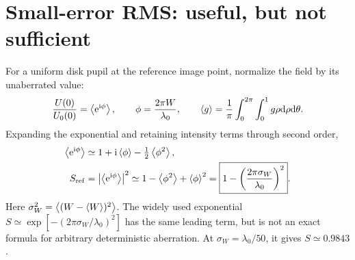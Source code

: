
\section{Small-error RMS: useful, but not sufficient}
For a uniform disk pupil at the reference image point, normalize the field by its unaberrated value:
\begin{equation}
\frac{U(0)}{U_0(0)}=\left\langle \mathrm{e}^{\mathrm{i}\phi}\right\rangle,\qquad
\phi=\frac{2\pi W}{\lambda_0},\qquad
\left\langle g\right\rangle=\frac1\pi\int_0^{2\pi}\int_0^1g\rho\mathrm{d}\rho\mathrm{d}\theta.
\end{equation}
Expanding the exponential and retaining intensity terms through second order,
\begin{align}
\left\langle \mathrm{e}^{\mathrm{i}\phi}\right\rangle&\simeq1+\mathrm{i}\left\langle \phi\right\rangle-\tfrac12\left\langle \phi^2\right\rangle,\\
S_{\rm ref}&=\left|\left\langle \mathrm{e}^{\mathrm{i}\phi}\right\rangle\right|^2
\simeq1-\left\langle \phi^2\right\rangle+\left\langle \phi\right\rangle^2
=\boxed{1-\left(\frac{2\pi\sigma_W}{\lambda_0}\right)^2}.
\end{align}
Here $\sigma_W^2=\left\langle (W-\left\langle W\right\rangle)^2\right\rangle$. The widely used exponential
$S\simeq\exp[-(2\pi\sigma_W/\lambda_0)^2]$ has the same leading term, but is not an exact formula for arbitrary deterministic aberration. At $\sigma_W=\lambda_0/50$, it gives $S\simeq0.9843$.

